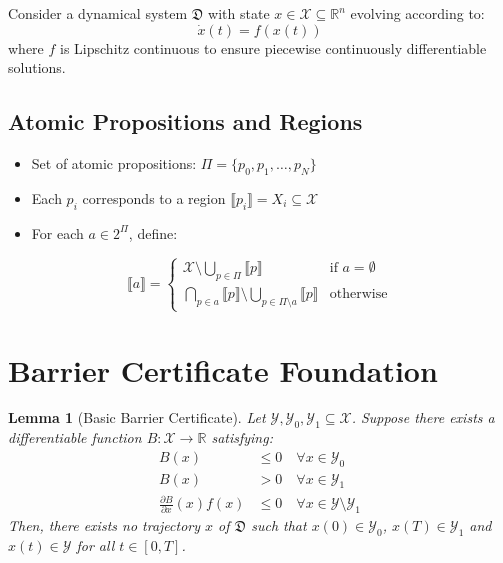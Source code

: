 \documentclass{article}
\newtheorem{lemma}{Lemma}
\begin{document}
Consider a dynamical system $\mathfrak{D}$ with state $x \in \mathcal{X} \subseteq \mathbb{R}^n$ evolving according to:
\begin{equation}
\dot{x}(t) = f(x(t))
\end{equation}
where $f$ is Lipschitz continuous to ensure piecewise continuously differentiable solutions.

\subsection{Atomic Propositions and Regions}

\begin{itemize}
    \item Set of atomic propositions: $\Pi = \{p_0, p_1, \ldots, p_N\}$
    \item Each $p_i$ corresponds to a region $\llbracket p_i \rrbracket = X_i \subseteq \mathcal{X}$
    \item For each $a \in 2^\Pi$, define:
\end{itemize}
\begin{equation}
\llbracket a \rrbracket = \begin{cases}
\mathcal{X} \setminus \bigcup_{p \in \Pi} \llbracket p \rrbracket & \text{if } a = \emptyset \\
\bigcap_{p \in a} \llbracket p \rrbracket \setminus \bigcup_{p \in \Pi \setminus a} \llbracket p \rrbracket & \text{otherwise}
\end{cases}
\end{equation}

\section{Barrier Certificate Foundation}

\begin{lemma}[Basic Barrier Certificate]
Let $\mathcal{Y}, \mathcal{Y}_0, \mathcal{Y}_1 \subseteq \mathcal{X}$. Suppose there exists a differentiable function $B: \mathcal{X} \to \mathbb{R}$ satisfying:
\begin{align}
B(x) &\leq 0 \quad \forall x \in \mathcal{Y}_0 \label{eq:bc1}\\
B(x) &> 0 \quad \forall x \in \mathcal{Y}_1 \label{eq:bc2}\\
\frac{\partial B}{\partial x}(x) f(x) &\leq 0 \quad \forall x \in \mathcal{Y} \setminus \mathcal{Y}_1 \label{eq:bc3}
\end{align}
Then, there exists no trajectory $x$ of $\mathfrak{D}$ such that $x(0) \in \mathcal{Y}_0$, $x(T) \in \mathcal{Y}_1$ and $x(t) \in \mathcal{Y}$ for all $t \in [0,T]$.
\end{lemma}
\end{document}
